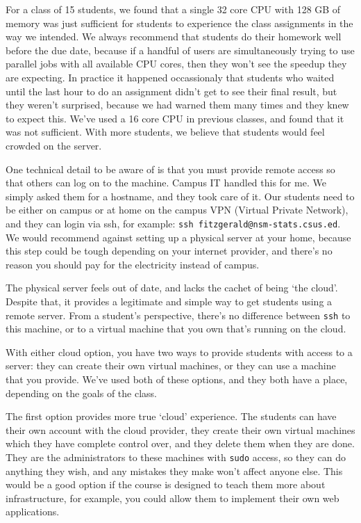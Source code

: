 \documentclass[12pt]{article}
\begin{document}
For a class of 15 students, we found that a single 32 core CPU with 128 GB of memory was just sufficient for students to experience the class assignments in the way we intended.
We always recommend that students do their homework well before the due date, because if a handful of users are simultaneously trying to use parallel jobs with all available CPU cores, then they won't see the speedup they are expecting.
In practice it happened occassionaly that students who waited until the last hour to do an assignment didn't get to see their final result, but they weren't surprised, because we had warned them many times and they knew to expect this.
We've used a 16 core CPU in previous classes, and found that it was not sufficient.
With more students, we believe that students would feel crowded on the server.

One technical detail to be aware of is that you must provide remote access so that others can log on to the machine.
Campus IT handled this for me.
We simply asked them for a hostname, and they took care of it.
Our students need to be either on campus or at home on the campus VPN (Virtual Private Network), and they can login via ssh, for example: \texttt{ssh fitzgerald@nsm-stats.csus.ed}.
We would recommend against setting up a physical server at your home, because this step could be tough depending on your internet provider, and there's no reason you should pay for the electricity instead of campus.

The physical server feels out of date, and lacks the cachet of being `the cloud'.
Despite that, it provides a legitimate and simple way to get students using a remote server.
From a student's perspective, there's no difference between \texttt{ssh} to this machine, or to a virtual machine that you own that's running on the cloud.

With either cloud option, you have two ways to provide students with access to a server: they can create their own virtual machines, or they can use a machine that you provide.
We've used both of these options, and they both have a place, depending on the goals of the class.

The first option provides more true `cloud' experience.
The students can have their own account with the cloud provider, they create their own virtual machines which they have complete control over, and they delete them when they are done.
They are the administrators to these machines with \texttt{sudo} access, so they can do anything they wish, and any mistakes they make won't affect anyone else.
This would be a good option if the course is designed to teach them more about infrastructure, for example, you could allow them to implement their own web applications.
\end{document}
